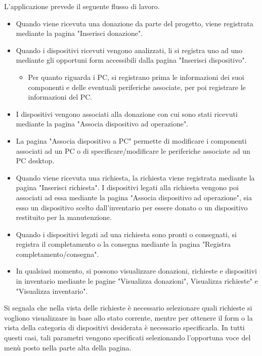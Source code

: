 \documentclass[a4paper,12pt]{report}
\begin{document}
\noindent L'applicazione prevede il seguente flusso di lavoro.
\begin{itemize}
    \item Quando viene ricevuta una donazione da parte del progetto, viene registrata mediante la pagina "Inserisci donazione".
    \item Quando i dispositivi ricevuti vengono analizzati, li si registra uno ad uno mediante gli opportuni form accessibili dalla pagina "Inserisci dispositivo".
    \begin{itemize}
        \item Per quanto riguarda i PC, si registrano prima le informazioni dei suoi componenti e delle eventuali periferiche associate, per poi registrare le informazioni del PC.
    \end{itemize}
    \item I dispositivi vengono associati alla donazione con cui sono stati ricevuti mediante la pagina "Associa dispositivo ad operazione".
    \item La pagina "Associa dispositivo a PC" permette di modificare i componenti associati ad un PC o di specificare/modificare le periferiche associate ad un PC desktop.
    \item Quando viene ricevuta una richiesta, la richiesta viene registrata mediante la pagina "Inserisci richiesta". I dispositivi legati alla richiesta vengono poi associati ad essa mediante la pagina "Associa dispositivo ad operazione", sia esso un dispositivo scelto dall'inventario per essere donato o un dispositivo restituito per la manutenzione.
    \item Quando i dispositivi legati ad una richiesta sono pronti o consegnati, si registra il completamento o la consegna mediante la pagina "Registra completamento/consegna".
    \item In qualsiasi momento, si possono visualizzare donazioni, richieste e dispositivi in inventario mediante le pagine "Visualizza donazioni", Visualizza richieste" e "Visualizza inventario".
\end{itemize}

\noindent Si segnala che nella vista delle richieste è necessario selezionare quali richieste si vogliono visualizzare in base allo stato corrente, mentre per ottenere il form o la vista della categoria di dispositivi desiderata è necessario specificarla. In tutti questi casi, tali parametri vengono specificati selezionando l'opportuna voce del menù posto nella parte alta della pagina. \\

\end{document}
